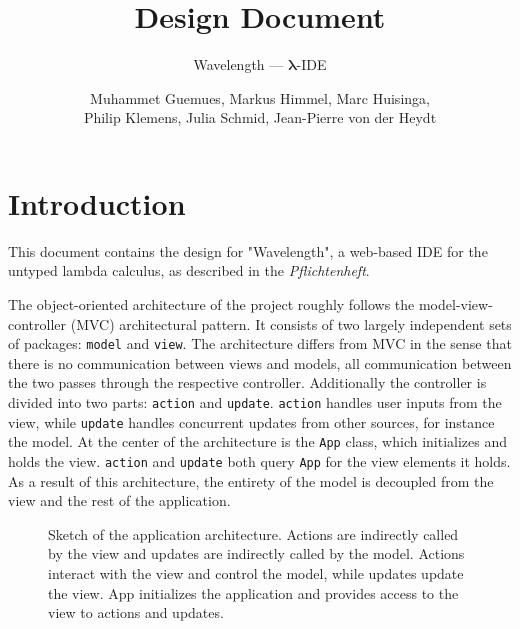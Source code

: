 \documentclass[a4paper, parskip=half]{scrartcl}
\title{Design Document}
\subtitle{Wavelength --- $\bm{\lambda}$-IDE}
\author{Muhammet Guemues, Markus Himmel, Marc Huisinga,\\Philip Klemens, Julia Schmid, Jean-Pierre von der Heydt}
\begin{document}
\maketitle
\thispagestyle{empty}
\newpage
\tableofcontents
\newpage
\section{Introduction}

This document contains the design for "Wavelength", a web-based IDE for the untyped
lambda calculus, as described in the \textit{Pflichtenheft}.

The object-oriented architecture of the project roughly follows the model-view-controller (MVC)
architectural pattern. It consists of two largely independent sets of packages: \texttt{model} and \texttt{view}.
The architecture differs from MVC in the sense that there is no communication between views and models, 
all communication between the two passes through the respective controller. 
Additionally the controller is divided into two parts: \texttt{action} and \texttt{update}. 
\texttt{action} handles user inputs from the view, while \texttt{update} handles concurrent updates from other sources, for instance the model.
At the center of the architecture is the \texttt{App} class, which initializes and holds the view. 
\texttt{action} and \texttt{update} both query \texttt{App} for the view elements it holds.
As a result of this architecture, the entirety of the model is decoupled from the view and the rest of the application.

\begin{figure}[h]
	\centering
	\caption{Sketch of the application architecture. Actions are indirectly called by the view
	and updates are indirectly called by the model. Actions interact with the view and control the model,
	while updates update the view. App initializes the application and provides access to the view to
		actions and updates.}
\end{figure}
\end{document}
